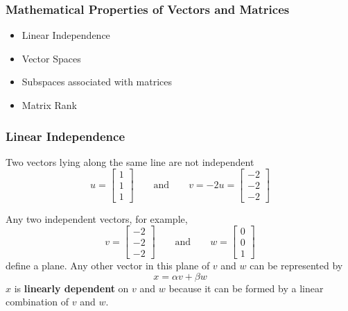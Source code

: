 \documentclass[10pt]{beamer}
\begin{document}
\begin{frame}
\frametitle{Mathematical Properties of Vectors and Matrices}


\begin{itemize}
    \item   Linear Independence
    \item   Vector Spaces
    \item   Subspaces associated with matrices
    \item   Matrix Rank
\end{itemize}

\end{frame}
\begin{frame}
\frametitle{Linear Independence}

Two vectors lying along the same line are not independent
\begin{equation*}
    u = \begin{bmatrix}1 \\ 1 \\ 1 \end{bmatrix}
    \qquad
    \text{and}
    \qquad
    v = -2u = \begin{bmatrix}-2 \\ -2 \\ -2 \end{bmatrix}
\end{equation*}

Any two independent vectors, for example,
\begin{equation*}
    v = \begin{bmatrix}-2 \\ -2 \\ -2 \end{bmatrix}
    \qquad
    \text{and}
    \qquad
    w = \begin{bmatrix}0 \\ 0 \\ 1 \end{bmatrix}
\end{equation*}
define a plane. Any other vector in this plane of $v$ and $w$ can be
represented by
\begin{equation*}
    x = \alpha v + \beta w
\end{equation*}
$x$ is \textbf{linearly dependent} on $v$ and $w$ because it
can be formed by a linear combination of $v$ and $w$.

\end{frame}
\end{document}
